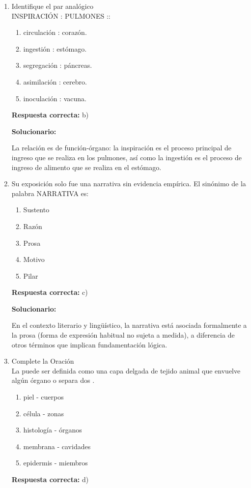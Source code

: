 \begin{enumerate}[resume]

	\item Identifique el par analógico\\
	INSPIRACIÓN : PULMONES ::
	\begin{enumerate}[label=\alph*)]
		\item circulación : corazón.
		\item ingestión : estómago.
		\item segregación : páncreas.
		\item asimilación : cerebro.
		\item inoculación : vacuna.
	\end{enumerate}
	\textbf{Respuesta correcta:} b)

	\vspace{2mm}
	\textbf{Solucionario:}

	La relación es de función-órgano: la inspiración es el proceso principal de ingreso que se realiza en los pulmones, así como la ingestión es el proceso de ingreso de alimento que se realiza en el estómago.

	\vspace{6mm}

	\item Su exposición solo fue una narrativa sin evidencia empírica. El sinónimo de la palabra NARRATIVA es:
	\begin{enumerate}[label=\alph*)]
		\item Sustento
		\item Razón
		\item Prosa
		\item Motivo
		\item Pilar
	\end{enumerate}
	\textbf{Respuesta correcta:} c)

	\vspace{2mm}
	\textbf{Solucionario:}

	En el contexto literario y lingüístico, la narrativa está asociada formalmente a la prosa (forma de expresión habitual no sujeta a medida), a diferencia de otros términos que implican fundamentación lógica.

	\vspace{6mm}

	\item Complete la Oración\\
	La \underline{\hspace{2cm}} puede ser definida como una capa delgada de tejido animal que envuelve algún órgano o separa dos \underline{\hspace{2cm}}.
	\begin{enumerate}[label=\alph*)]
		\item piel - cuerpos
		\item célula - zonas
		\item histología - órganos
		\item membrana - cavidades
		\item epidermis - miembros
	\end{enumerate}
	\textbf{Respuesta correcta:} d)


\end{enumerate}

